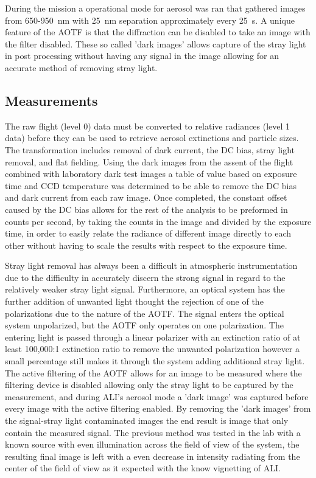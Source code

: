 \documentclass[12pt]{article}
\begin{document}
During the mission a operational mode for aerosol was ran that gathered images from 650-950~nm with 25~nm separation approximately every 25~s. A unique feature of the AOTF is that the diffraction can be disabled to take an image with the filter disabled. These so called 'dark images' allows capture of the stray light in post processing without having any signal in the image allowing for an accurate method of removing stray light.

\subsection{Measurements}

The raw flight (level 0) data must be converted to relative radiances (level 1 data) before they can be used to retrieve aerosol extinctions and particle sizes. The transformation includes removal of dark current, the DC bias, stray light removal, and flat fielding. Using the dark images from the assent of the flight combined with laboratory dark test images a table of value based on exposure time and CCD temperature was determined to be able to remove the DC bias and dark current from each raw image. Once completed, the constant offset caused by the DC bias allows for the rest of the analysis to be preformed in counts per second, by taking the counts in the image and divided by the exposure time, in order to easily relate the radiance of different image directly to each other without having to scale the results with respect to the exposure time.

Stray light removal has always been a difficult in atmospheric instrumentation due to the difficulty in accurately discern the strong signal in regard to the relatively weaker stray light signal. Furthermore, an optical system has the further addition of unwanted light thought the rejection of one of the polarizations due to the nature of the AOTF. The signal enters the optical system unpolarized, but the AOTF only operates on one polarization. The entering light is passed through a linear polarizer with an extinction ratio of at least 100,000:1 extinction ratio to remove the unwanted polarization however a small percentage still makes it through the system adding additional stray light. The active filtering of the AOTF allows for an image to be measured where the filtering device is disabled allowing only the stray light to be captured by the measurement, and during ALI's aerosol mode a 'dark image' was captured before every image with the active filtering enabled. By removing the 'dark images' from the signal-stray light contaminated images the end result is image that only contain the measured signal. The previous method was tested in the lab with a known source with even illumination across the field of view of the system, the resulting final image is left with a even decrease in intensity radiating from the center of the field of view as it expected with the know vignetting of ALI.
\end{document}
